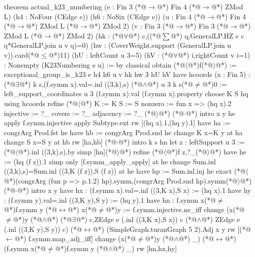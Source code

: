 theorem actual_k23_numbering (e : Fin 3 (*@$\to$@*) Fin 4 (*@$\to$@*) ZMod L)
    (h4 : NoFour (CEdge e)) (h6 : NoSix (CEdge e))
    (u : Fin 4 (*@$\to$@*) Fin 4 (*@$\to$@*) ZMod L (*@$\to$@*) ZMod 2)
    (v : Fin 3 (*@$\to$@*) Fin 3 (*@$\to$@*) ZMod L (*@$\to$@*) ZMod 2)
    (hk : (*@$\forall$@*) c,((*@$\sum$@*) q,GeneralLP.HZ e c q*GeneralLP.join u v q)=0)
    (hw : (CoverWeight.support (GeneralLP.join u v)).card(*@$\le$@*)11)
    (hU : leftCount u 3=5) (hV : (*@$\forall$@*) i,rightCount v i=1) : Nonempty (K23Numbering e u) := by
  classical
  obtain (*@$\langle$@*)f(*@$\rangle$@*) := exceptional_group_is_k23 e h4 h6 u v hk hw 3 hU hV
  have hcoords (x : Fin 5) : (*@$\exists$@*) k s,(f.symm x).val=.inl ((3,k),s) (*@$\land$@*) u 3 k s(*@$\ne$@*)0 :=
    left_support_coordinates u 3 (f.symm x).val (f.symm x).property
  choose K S hq using hcoords
  refine (*@$\langle$@*){
    K := K
    S := S
    nonzero := fun x => (hq x).2
    injective := ?_
    covers := ?_
    adjacency := ?_
  }(*@$\rangle$@*)
  (*@$\cdot$@*) intro x y he
    apply f.symm.injective
    apply Subtype.ext
    rw [(hq x).1,(hq y).1]
    have ha := congrArg Prod.fst he
    have hb := congrArg Prod.snd he
    change K x=K y at ha
    change S x=S y at hb
    rw [ha,hb]
  (*@$\cdot$@*) intro k s hn
    let z : leftSupport u 3 := (*@$\langle$@*).inl ((3,k),s),by simp [hn](*@$\rangle$@*)
    refine (*@$\langle$@*)f z,?_(*@$\rangle$@*)
    have he := (hq (f z)).1
    simp only [f.symm_apply_apply] at he
    change Sum.inl ((3,k),s)=Sum.inl ((3,K (f z)),S (f z)) at he
    have hp := Sum.inl.inj he
    exact (*@$\langle$@*)(congrArg (fun p => p.1.2) hp).symm,(congrArg Prod.snd hp).symm(*@$\rangle$@*)
  (*@$\cdot$@*) intro x y
    have hx : (f.symm x).val=.inl ((3,K x),S x) := (hq x).1
    have hy : (f.symm y).val=.inl ((3,K y),S y) := (hq y).1
    have hn : f.symm x(*@$\ne$@*)f.symm y (*@$\leftrightarrow$@*) x(*@$\ne$@*)y := f.symm.injective.ne_iff
    change (x(*@$\ne$@*)y (*@$\land$@*) (*@$\exists$@*) c,ZEdge e (.inl ((3,K x),S x)) c (*@$\land$@*) ZEdge e (.inl ((3,K y),S y)) c) (*@$\leftrightarrow$@*)
      (SimpleGraph.turanGraph 5 2).Adj x y
    rw [(*@$\leftarrow$@*) f.symm.map_adj_iff]
    change (x(*@$\ne$@*)y (*@$\land$@*) _) (*@$\leftrightarrow$@*) (f.symm x(*@$\ne$@*)f.symm y (*@$\land$@*) _)
    rw [hn,hx,hy]
